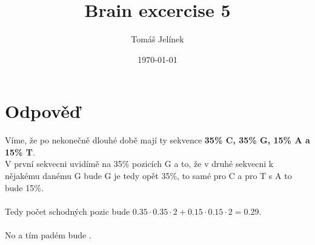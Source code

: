 \documentclass{article}
\title{Brain excercise 5}
\author{Tomáš Jelínek}
\date{\today}
\begin{document}
\maketitle

\section*{Odpověď}

Víme, že po nekonečně dlouhé době mají ty sekvence \textbf{35\% C, 35\% G, 15\% A a 15\% T}.
\\
V první sekvecni uvidímě na 35\% pozicích G a to, že v druhé sekvecni k nějakému danému G bude G je tedy opět 35\%, to samé pro C a pro T s A to bude 15\%.
\\
\\
Tedy počet schodných pozic bude $0.35 \cdot 0.35 \cdot 2 + 0.15 \cdot 0.15 \cdot 2 = 0.29$.
\\
\\
No a tím padém bude .
\end{document}
